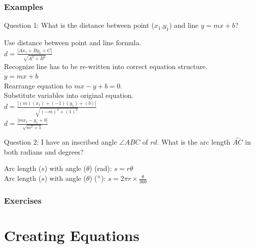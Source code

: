 \documentclass[12pt, oneside]{book}
\begin{document}
\subsection{Examples}
Question 1: What is the distance between point ($x_1$,$y_1$) and line $y=mx+b$? \\
\begin{center}    
    Use distance between point and line formula. \\ 
    $d = \frac{ \left | Ax_1 + By_1 + C \right | }{\sqrt{A^2 + B^2}} $ \\
    Recognize line has to be re-written into correct equation structure. \\
    $y=mx+b$ \\
    Rearrange equation to $mx - y + b=0$. \\
    Substitute variables into original equation. \\
    $d = \frac{ \left | (m)(x_1) + (-1)(y_1) + (b) \right | }{\sqrt{(-m)^2 + (1)^2}} $ \\
    $d = \frac{ \left | mx_1 - y_1 + b \right |}{\sqrt{m^2 + 1}}$ \\
\end{center}

\noindent Question 2: I have an inscribed angle $\angle ABC$ of $rd$. What is the arc length $\overset{\frown}{AC}$ in both radians and degrees? \\
\begin{center}
    Arc length ($s$) with angle ($\theta$) (rad): $s = r \theta$ \\
    Arc length ($s$) with angle ($\theta$) ($\degree$): $s = 2\pi r \times \frac{\theta}{360}$ \\
\end{center}

\subsection{Exercises}

\chapter{Creating Equations}
\end{document}
